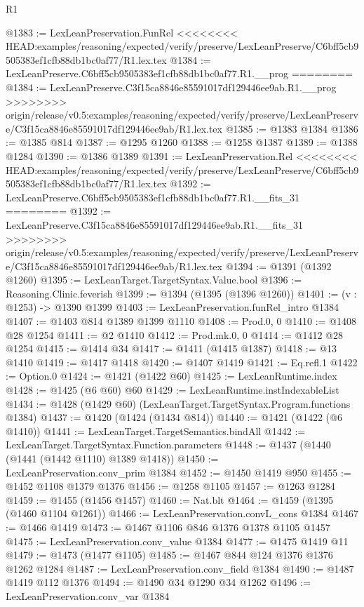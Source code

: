 \begin{lexlean}{R1}
\begin{coremodule}
{{{{{{{{{{{{{{{{{{{{{{{{{{{{{{{{{{{{{{{{{{{{{{{{{{{{{{{{{{{{{{{{{{{{{{{{{{{{{{{{{{{{{{{{{{@1383 := LexLeanPreservation.FunRel
<<<<<<<< HEAD:examples/reasoning/expected/verify/preserve/LexLeanPreserve/C6bff5cb9505383ef1cfb88db1bc0af77/R1.lex.tex
@1384 := LexLeanPreserve.C6bff5cb9505383ef1cfb88db1bc0af77.R1.__prog
========
@1384 := LexLeanPreserve.C3f15ca8846e85591017df129446ee9ab.R1.__prog
>>>>>>>> origin/release/v0.5:examples/reasoning/expected/verify/preserve/LexLeanPreserve/C3f15ca8846e85591017df129446ee9ab/R1.lex.tex
@1385 := @1383 @1384
@1386 := @1385 @814
@1387 := @1295 @1260
@1388 := @1258 @1387
@1389 := @1388 @1284
@1390 := @1386 @1389
@1391 := LexLeanPreservation.Rel
<<<<<<<< HEAD:examples/reasoning/expected/verify/preserve/LexLeanPreserve/C6bff5cb9505383ef1cfb88db1bc0af77/R1.lex.tex
@1392 := LexLeanPreserve.C6bff5cb9505383ef1cfb88db1bc0af77.R1.__fits_31
========
@1392 := LexLeanPreserve.C3f15ca8846e85591017df129446ee9ab.R1.__fits_31
>>>>>>>> origin/release/v0.5:examples/reasoning/expected/verify/preserve/LexLeanPreserve/C3f15ca8846e85591017df129446ee9ab/R1.lex.tex
@1394 := @1391 (@1392 @1260)
@1395 := LexLeanTarget.TargetSyntax.Value.bool
@1396 := Reasoning.Clinic.feverish
@1399 := @1394 (@1395 (@1396 @1260))
@1401 := (v : @1253) -> @1390 @1399
@1403 := LexLeanPreservation.funRel_intro @1384
@1407 := @1403 @814 @1389 @1399 @1110
@1408 := Prod.{0, 0}
@1410 := @1408 @28 @1254
@1411 := @2 @1410
@1412 := Prod.mk.{0, 0}
@1414 := @1412 @28 @1254
@1415 := @1414 @34
@1417 := @1411 (@1415 @1387)
@1418 := @13 @1410
@1419 := @1417 @1418
@1420 := @1407 @1419
@1421 := Eq.refl.{1}
@1422 := Option.{0}
@1424 := @1421 (@1422 @60)
@1425 := LexLeanRuntime.index
@1428 := @1425 (@6 @60) @60
@1429 := LexLeanRuntime.instIndexableList
@1434 := @1428 (@1429 @60) (LexLeanTarget.TargetSyntax.Program.functions @1384)
@1437 := @1420 (@1424 (@1434 @814))
@1440 := @1421 (@1422 (@6 @1410))
@1441 := LexLeanTarget.TargetSemantics.bindAll
@1442 := LexLeanTarget.TargetSyntax.Function.parameters
@1448 := @1437 (@1440 (@1441 (@1442 @1110) @1389 @1418))
@1450 := LexLeanPreservation.conv_prim @1384
@1452 := @1450 @1419 @950
@1455 := @1452 @1108 @1379 @1376
@1456 := @1258 @1105
@1457 := @1263 @1284
@1459 := @1455 (@1456 @1457)
@1460 := Nat.blt
@1464 := @1459 (@1395 (@1460 @1104 @1261))
@1466 := LexLeanPreservation.convL_cons @1384
@1467 := @1466 @1419
@1473 := @1467 @1106 @846 @1376 @1378 @1105 @1457
@1475 := LexLeanPreservation.conv_value @1384
@1477 := @1475 @1419 @11
@1479 := @1473 (@1477 @1105)
@1485 := @1467 @844 @124 @1376 @1376 @1262 @1284
@1487 := LexLeanPreservation.conv_field @1384
@1490 := @1487 @1419 @112 @1376
@1494 := @1490 @34 @1290 @34 @1262
@1496 := LexLeanPreservation.conv_var @1384
}}}}}}}}}}}}}}}}}}}}}}}}}}}}}}}}}}}}}}}}}}}}}}}}}}}}}}}}}}}}}}}}}}}}}}}}}}}}}}}}}}}}}}}}}}
\end{coremodule}
\end{lexlean}
